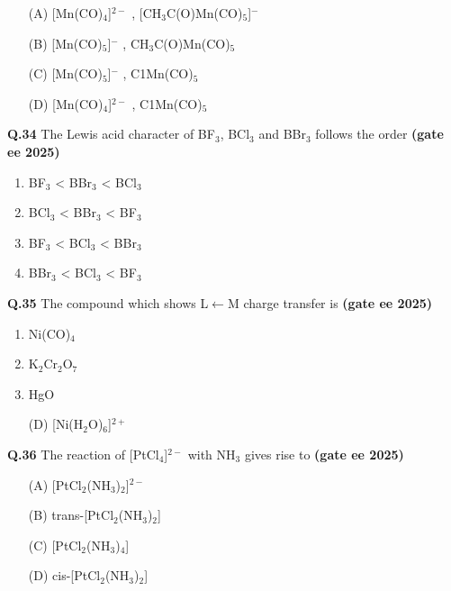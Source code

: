 \documentclass[journal,12pt,onecolumn]{exam}
\theoremstyle{remark}
\begin{document}
\begin{multicols}{2}
\begin{enumerate}[label=(\Alph*)]
\item[(A)] [Mn(CO)$_4$]$^{2-}$ , [CH$_3$C(O)Mn(CO)$_5$]$^{-}$  
\item[(B)] [Mn(CO)$_5$]$^{-}$ , CH$_3$C(O)Mn(CO)$_5$  
\item[(C)] [Mn(CO)$_5$]$^{-}$ , C1Mn(CO)$_5$  
\item[(D)] [Mn(CO)$_4$]$^{2-}$ , C1Mn(CO)$_5$  
\end{enumerate}
\end{multicols}
\vspace{0.5cm}

\noindent \textbf{Q.34} The Lewis acid character of BF$_3$, BCl$_3$ and BBr$_3$ follows the order  \hfill{\textbf{(gate ee 2025)}}

\begin{multicols}{2}
\begin{enumerate}[label=(\Alph*)]
\item BF$_3$ < BBr$_3$ < BCl$_3$  
\item BCl$_3$ < BBr$_3$ < BF$_3$  
\item BF$_3$ < BCl$_3$ < BBr$_3$  
\item BBr$_3$ < BCl$_3$ < BF$_3$  
\end{enumerate}
\end{multicols}
\vspace{0.5cm}

\noindent \textbf{Q.35} The compound which shows L$\leftarrow$M charge transfer is  \hfill{\textbf{(gate ee 2025)}}

\begin{multicols}{2}
\begin{enumerate}[label=(\Alph*)]
\item Ni(CO)$_4$  
\item K$_2$Cr$_2$O$_7$  
\item HgO  
\item[(D)] [Ni(H$_2$O)$_6$]$^{2+}$  
\end{enumerate}
\end{multicols}
\vspace{0.5cm}

\noindent \textbf{Q.36} The reaction of [PtCl$_4$]$^{2-}$ with NH$_3$ gives rise to  \hfill{\textbf{(gate ee 2025)}}

\begin{multicols}{2}
\begin{enumerate}[label=(\Alph*)]
\item[(A)] [PtCl$_2$(NH$_3$)$_2$]$^{2-}$  
\item[(B)] trans-[PtCl$_2$(NH$_3$)$_2$]  
\item[(C)] [PtCl$_2$(NH$_3$)$_4$]  
\item[(D)] cis-[PtCl$_2$(NH$_3$)$_2$]  
\end{enumerate}
\end{multicols}
\vspace{0.5cm}
\end{document}
